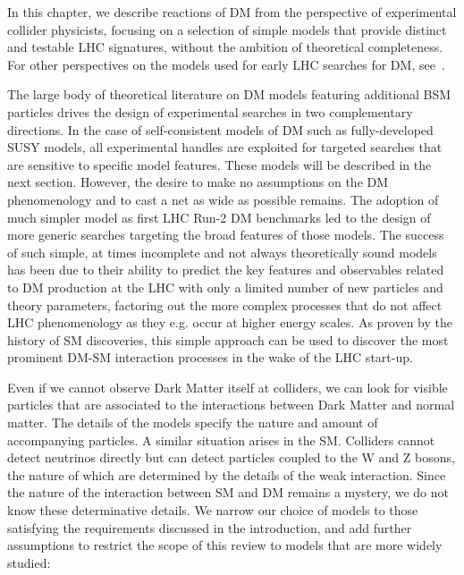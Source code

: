 In this chapter, we describe reactions of DM from the perspective of experimental collider physicists, focusing on a selection of simple models that provide distinct and testable LHC signatures, without the ambition of theoretical completeness. For other perspectives on the models used for early LHC searches for DM, see~\cite{Kahlhoefer:2017dnp,Abercrombie:2015wmb,Arcadi:2017kky,Feng:2010gw}. 

The large body of theoretical literature on DM models featuring additional BSM particles drives the design of experimental searches in two complementary directions. In the case of self-consistent models of DM such as fully-developed SUSY models, all experimental handles are exploited for targeted searches that are sensitive to specific model features. These models will be described in the next section. However, the desire to make no assumptions on the DM phenomenology and to cast a net as wide as possible remains. The adoption of much simpler model as first LHC Run-2 DM benchmarks led to the design of more generic searches targeting the broad features of those models. The success of such simple, at times incomplete and not always theoretically sound models has been due to their ability to predict the key features and observables related to DM production at the LHC with only a limited number of new particles and theory parameters, factoring out the more complex processes that do not affect LHC phenomenology as they e.g. occur at higher energy scales. As proven by the history of SM discoveries, this simple approach can be used to discover the most prominent DM-SM interaction processes in the wake of the LHC start-up. 

Even if we cannot observe Dark Matter itself at colliders, we can look for visible particles that are associated to the interactions between Dark Matter and normal matter. The details of the models specify the nature and amount of accompanying particles. A similar situation arises in the SM. Colliders cannot detect neutrinos directly but can detect particles coupled to the W and Z bosons, the nature of which are determined by the details of the weak interaction. Since the nature of the interaction between SM and DM remains a mystery, we do not know these determinative details. We narrow our choice of models to those satisfying the requirements discussed in the introduction, and add further assumptions to restrict the scope of this review to models that are more widely studied:

